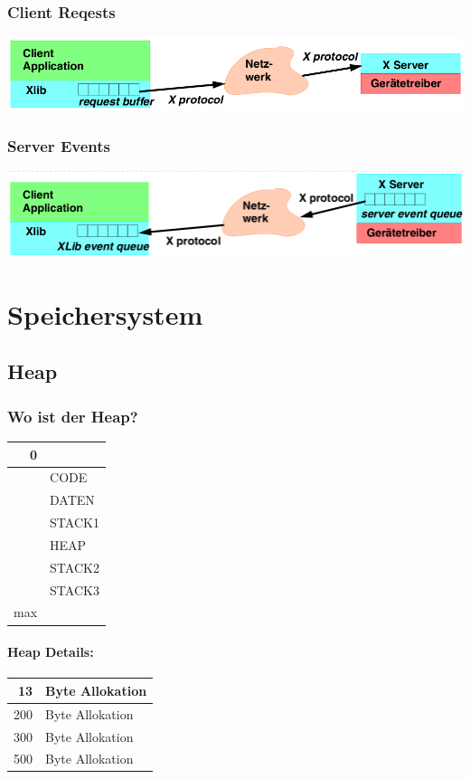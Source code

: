 \subsubsection{Client Reqests}
\includegraphics[width=\linewidth]{img/x_client_request.png}

\subsubsection{Server Events}
\includegraphics[width=\linewidth]{img/x_server_event.png}

\section{Speichersystem}

\subsection{Heap}

\subsubsection{Wo ist der Heap?}

\begin{tabular}{| r | l |}
\hline
0 & \\
\hline
& CODE\\
\hline
& DATEN\\
\hline
& STACK1\\
\hline
& HEAP\\
\hline
& STACK2\\
\hline
& STACK3\\
\hline
max & \\
\hline
\end{tabular}

\paragraph{Heap Details:}

\begin{tabular}{ | r | l |}
\hline
13 & Byte Allokation \\
\hline
200 & Byte Allokation \\
\hline
300 & Byte Allokation \\
\hline
500 & Byte Allokation \\
\hline
\end{tabular}

